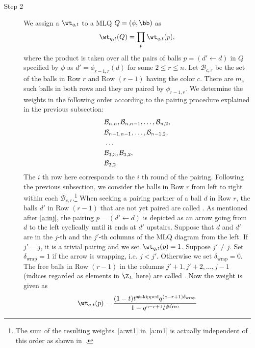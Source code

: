 \begin{description}
\item[Step 2]
We assign a  ${\wt}_{q,t}$ to a MLQ $Q = (\phi, \bb)$ as
\begin{align}\label{a:wt1}
\wt_{q,t}(Q) = \prod_p \wt_{q,t}(p),
\end{align}
where the product is taken over all the pairs of balls $p = (d' \leftarrow d)$ in $Q$
specified by $\phi$ as $d' = \phi_{r-1,r}(d)$ for some $2 \le r \le n$.
%
Let $\mathcal{B}_{c,r}$ be the set of the balls in Row $r$ and Row $(r\!-\!1)$ having the color $c$.
There are $m_c$ such balls in both rows and they are paired by $\phi_{r-1,r}$.
We determine the weights in the following order according to the pairing procedure explained  in the previous subsection:
\begin{equation}\label{a:BB}
\begin{split}
&\mathcal{B}_{n,n}, \mathcal{B}_{n,n-1},\ldots, \mathcal{B}_{n,2}, \\ \smallskip
&\mathcal{B}_{n-1,n-1},\ldots, \mathcal{B}_{n-1,2}, \\ \smallskip
& \ldots \\ \smallskip
&\mathcal{B}_{3, 3}, \mathcal{B}_{3, 2}, \\ \smallskip
&\mathcal{B}_{2,2}.
\end{split}
\end{equation}
The $i$ th row here corresponds to the $i$ th round of the pairing.
%
Following the previous subsection,  
we consider the balls in Row $r$ from left to right within each $\mathcal{B}_{c,r}$.\footnote{
The sum of the resulting weights~\eqref{a:wt1} in~\eqref{a:m1} is actually independent of this order as shown in~\cite[Lem.~2.1]{CMW}.}
%
When seeking a pairing partner of 
a ball $d$ in Row $r$, the balls $d'$ in Row $(r-1)$ that are not yet paired are called .
As mentioned after \eqref{a:inj}, the pairing $p = (d' \leftarrow d)$ is depicted as an arrow
going from $d$ to the left cyclically until it ends at $d'$ upstairs.
Suppose that $d$ and $d'$ are in the $j$-th and the $j'$-th columns of the 
MLQ diagram from the left.
If $j'=j$, it is a trivial pairing and we set $\wt_{q,t}(p)=1$.
Suppose $j'\neq j$.
Set $\delta_{\text{wrap}}=1$ if the arrow is wrapping, i.e. $j<j'$.
Otherwise we set $\delta_{\text{wrap}}=0$.
The free balls in Row $(r-1)$ in the columns $j'+1, j'+2,\ldots, j-1$
(indices regarded as elements in $ \Z_L$ here) are called .
Now the weight is given as
\begin{align}
\wt_{q,t}(p) =
\dfrac{(1-t)t^{\#\text{skipped}}q^{(c-r+1)\delta_{\text{wrap}}}}{1-q^{c-r+1}t^{\#\text{free}}}

\end{align}
\end{description}

